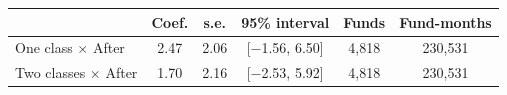 \begin{tabular}{lccccc}
\toprule
 & Coef. & s.e. & 95\% interval & Funds & Fund-months \\
\midrule
One class $\times$ After & 2.47 & 2.06 & [$-$1.56, 6.50] & 4,818 & 230,531 \\
Two classes $\times$ After & 1.70 & 2.16 & [$-$2.53, 5.92] & 4,818 & 230,531 \\
\bottomrule
\end{tabular}
